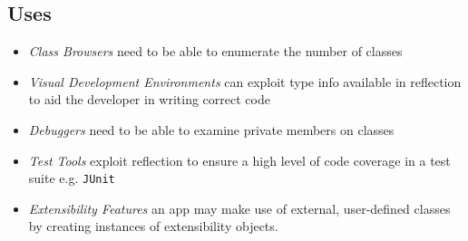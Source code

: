 \subsection{Uses}
\begin{itemize}
    \item \textit{Class Browsers} need to be able to enumerate the number of classes
    \item \textit{Visual Development Environments} can exploit type info available in reflection to aid the developer in writing correct code
    \item \textit{Debuggers} need to be able to examine private members on classes
    \item \textit{Test Tools} exploit reflection to ensure a high level of code coverage in a test suite e.g. \texttt{JUnit}
    \item \textit{Extensibility Features} an app may make use of external, user-defined classes by creating instances of extensibility objects.
\end{itemize}

